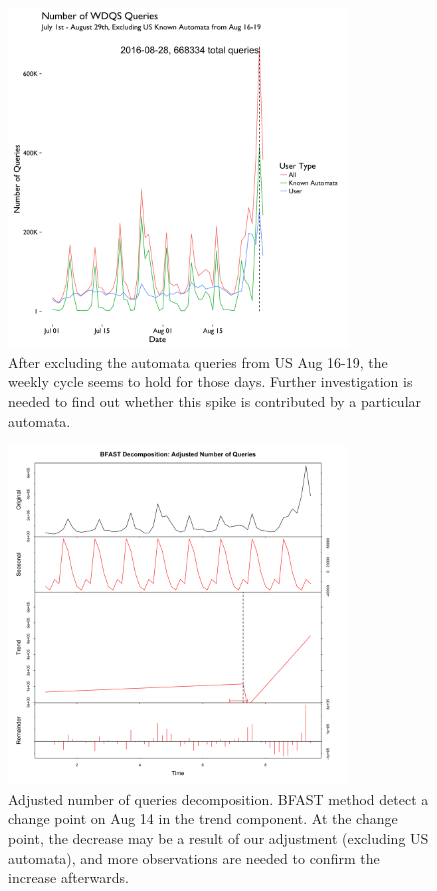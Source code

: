 \documentclass[12pt,]{article}
\begin{document}
\begin{figure}[H]
\centering
\includegraphics[width=9cm,height=9cm,keepaspectratio]{figures/all_query_ecl_us_spider0816_ts.png}
\caption{After excluding the automata queries from US Aug 16-19, the
weekly cycle seems to hold for those days. Further investigation is
needed to find out whether this spike is contributed by a particular
automata.\label{eclus}}
\end{figure}

\begin{figure}[H]
\centering
\includegraphics[width=9cm,height=9cm,keepaspectratio]{figures/adjust_query_decompose.png}
\caption{Adjusted number of queries decomposition. BFAST method detect a
change point on Aug 14 in the trend component. At the change point, the
decrease may be a result of our adjustment (excluding US automata), and
more observations are needed to confirm the increase afterwards.}
\end{figure}
\end{document}
